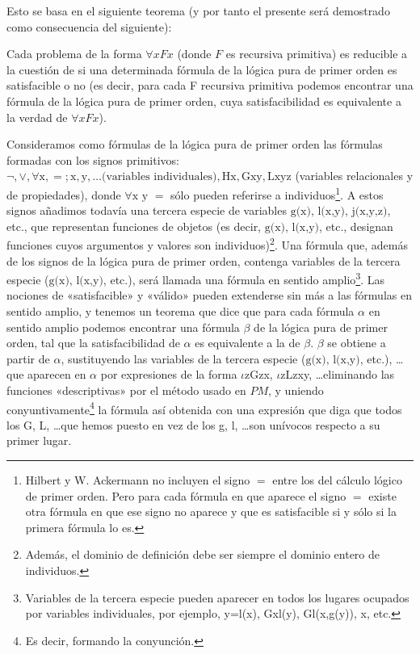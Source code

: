 Esto se basa en el siguiente teorema (y por tanto el presente será demostrado como consecuencia del siguiente):
\begin{teorema} \label{teo:TeoremaX}
    Cada problema de la forma $\forall x F x$ (donde $F$ es recursiva primitiva) es reducible a la cuestión de si una determinada fórmula de la lógica pura de primer 
    orden es satisfacible o no (es decir, para cada F recursiva primitiva podemos encontrar una fórmula de la lógica pura de primer orden, cuya satisfacibilidad es
    equivalente a la verdad de $\forall x F x$).
\end{teorema}

Consideramos como fórmulas de la lógica pura de primer orden las fórmulas formadas con los signos primitivos: 
$\lnot, \vee, \forall\text{x}, =; \text{x}, \text{y}, \dots \text{(variables individuales)}, \text{Hx}, \text{Gxy}, \text{Lxyz}$ (variables relacionales y de 
propiedades), donde $\forall \text{x y } =$ sólo pueden referirse a individuos\footnote{Hilbert y W. Ackermann no incluyen el signo $=$
entre los del cálculo lógico de primer orden. Pero para cada fórmula en que aparece el signo $=$ existe otra fórmula en que ese signo no aparece y que es
satisfacible si y sólo si la primera fórmula lo es.}. A estos signos añadimos todavía una tercera especie de variables $\text{g(x), l(x,y), j(x,y,z)}$, etc., 
que representan funciones de objetos (es decir, $\text{g(x), l(x,y)}$, etc., designan funciones cuyos argumentos y valores son individuos)\footnote{Además, el dominio 
de definición debe ser siempre el dominio entero de individuos.}. Una fórmula que, además de los signos de la lógica pura de primer orden, contenga variables de la 
tercera especie ($\text{g(x), l(x,y)}$, etc.), será llamada una fórmula en sentido amplio\footnote{Variables de la tercera especie pueden aparecer en todos los 
lugares ocupados por variables individuales, por ejemplo, y=l(x), Gxl(y), Gl(x,g(y)), x, etc.}. Las nociones de «satisfacible» y «válido» pueden extenderse sin
más a las fórmulas en sentido amplio, y tenemos un teorema que dice que para cada fórmula $\alpha$ en sentido amplio podemos encontrar una fórmula $\beta$ de la lógica 
pura de primer orden, tal que la satisfacibilidad de $\alpha$ es equivalente a la de $\beta$. $\beta$ se obtiene a partir de $\alpha$, sustituyendo las variables de 
la tercera especie ($\text{g(x), l(x,y)}$, etc.), \dots que aparecen en $\alpha$ por expresiones de la forma $\iota$zGzx, $\iota$zLzxy, \dots eliminando las funciones 
«descriptivas» por el método usado en $PM$, y uniendo conyuntivamente\footnote{Es decir, formando la conyunción.} la fórmula así obtenida con una expresión que diga que
todos los G, L, \dots que hemos puesto en vez de los g, l, \dots son unívocos respecto a su primer lugar.

